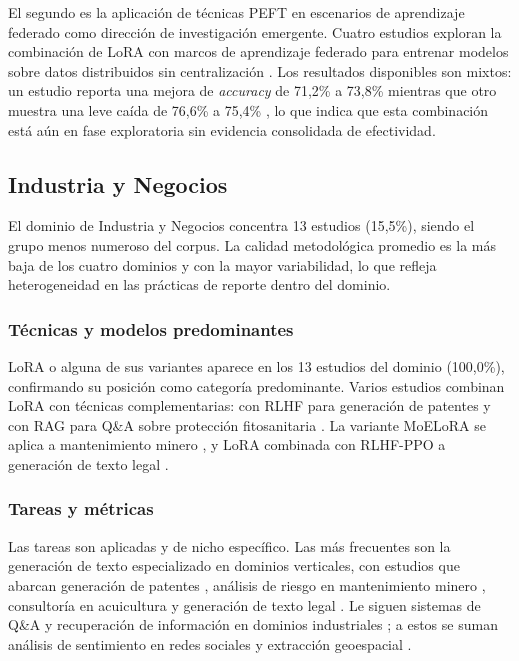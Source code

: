 El segundo es la aplicación de técnicas PEFT en escenarios de aprendizaje federado como dirección de investigación emergente. Cuatro estudios exploran la combinación de LoRA con marcos de aprendizaje federado para entrenar modelos sobre datos distribuidos sin centralización \parencite{elbakary2025mira, li2025federated, liu2025federated, iftikhar2025peft}. Los resultados disponibles son mixtos: un estudio reporta una mejora de \textit{accuracy} de 71,2\% a 73,8\% \parencite{iftikhar2025peft} mientras que otro muestra una leve caída de 76,6\% a 75,4\% \parencite{li2025federated}, lo que indica que esta combinación está aún en fase exploratoria sin evidencia consolidada de efectividad.

\subsection{Industria y Negocios}

El dominio de Industria y Negocios concentra 13 estudios (15,5\%), siendo el grupo menos numeroso del corpus. La calidad metodológica promedio es la más baja de los cuatro dominios y con la mayor variabilidad, lo que refleja heterogeneidad en las prácticas de reporte dentro del dominio.

\subsubsection{Técnicas y modelos predominantes}

LoRA o alguna de sus variantes aparece en los 13 estudios del dominio (100,0\%), confirmando su posición como categoría predominante. Varios estudios combinan LoRA con técnicas complementarias: con RLHF para generación de patentes \parencite{ren2025patent} y con RAG para Q\&A sobre protección fitosanitaria \parencite{xiong2025lora}. La variante MoELoRA se aplica a mantenimiento minero \parencite{cao2025lora}, y LoRA combinada con RLHF-PPO a generación de texto legal \parencite{peng2025keyword}.

\subsubsection{Tareas y métricas}

Las tareas son aplicadas y de nicho específico. Las más frecuentes son la generación de texto especializado en dominios verticales, con estudios que abarcan generación de patentes \parencite{ren2025patent}, análisis de riesgo en mantenimiento minero \parencite{cao2025lora, sun2024mirachatglm}, consultoría en acuicultura \parencite{song2025lora} y generación de texto legal \parencite{peng2025keyword}. Le siguen sistemas de Q\&A y recuperación de información en dominios industriales \parencite{xiong2025lora, zhou2025kg}; a estos se suman análisis de sentimiento en redes sociales \parencite{lin2024lora} y extracción geoespacial \parencite{han2025ft2}.

